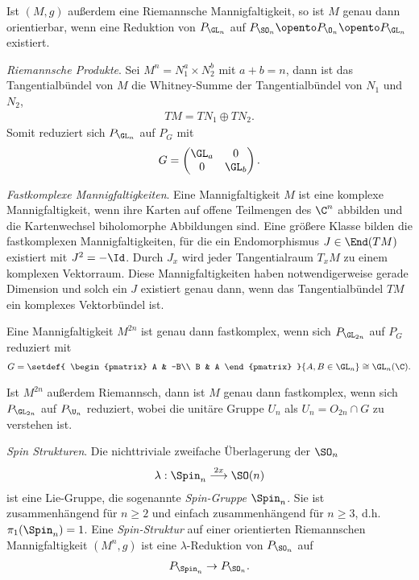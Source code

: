 \documentclass[%
	paper=a5,%
	fleqn,%
	DIV=18,%
	BCOR=0mm,
	fontsize=11pt,
	titlepage=false,%
	bibliography=totoc,
	DIV=18,%
	twoside=true,
	pdftitle=Riemannsche Geometrie,
	pdfauthor=Uwe Semmelmann,
	numbers=noendperiod]%
	{scrbook}
\begin{document}
\begin{ex}
\begin{exenum}
Ist $(M,g)$ außerdem eine Riemannsche Mannigfaltigkeit, so ist $M$ genau dann
orientierbar, wenn eine Reduktion von $P_{\GL_n}$ auf $P_{\SO_n}\opento
P_{\O_n}\opento P_{\GL_n}$ existiert.
\item \textit{Riemannsche Produkte}. Sei $M^n = N_1^a \times N_2^b$ mit $a+b =
n$, dann ist das Tangentialbündel von $M$ die Whitney-Summe der Tangentialbündel
von $N_1$ und $N_2$,
\begin{align*}
TM = TN_1\oplus TN_2.
\end{align*}
Somit reduziert sich $P_{\GL_n}$ auf $P_G$ mit
\begin{align*}
G = 
\begin{pmatrix}
\GL_a & 0 \\
0 & \GL_b
\end{pmatrix}.
\end{align*}
\item \textit{Fastkomplexe Mannigfaltigkeiten}. Eine Mannigfaltigkeit $M$ ist
eine komplexe Mannigfaltigkeit, wenn ihre Karten  auf offene
Teilmengen des $\C^n$ abbilden und die Kartenwechsel biholomorphe Abbildungen sind. 
Eine größere Klasse bilden die fastkomplexen
Mannigfaltigkeiten, für die ein Endomorphismus $J\in \End(TM)$ existiert
mit $J^2 = -\Id$. Durch $J_x$ wird jeder Tangentialraum $T_xM$ zu einem komplexen
Vektorraum.
Diese Mannigfaltigkeiten haben notwendigerweise gerade
Dimension und solch ein $J$ existiert genau dann, wenn das Tangentialbündel $TM$
ein komplexes Vektorbündel ist.

Eine Mannigfaltigkeit $M^{2n}$ ist genau dann fastkomplex, wenn sich
$P_{\GL_{2n}}$ auf $P_G$ reduziert mit
\begin{align*}
G = 
\setdef{
\begin{pmatrix}
A & -B\\
B & A
\end{pmatrix}
}{A,B\in \GL_n} \cong \GL_n(\C) .
\end{align*}

Ist $M^{2n}$ außerdem Riemannsch, dann ist $M$ genau dann fastkomplex, wenn sich
$P_{\GL_{2n}}$ auf $P_{\U_n}$ reduziert, wobei die unitäre Gruppe  $U_n$ als $U_n = O_{2n}\cap G$
zu verstehen ist.
\item \textit{Spin Strukturen}.
Die nichttriviale zweifache Überlagerung der $\SO_n$
\begin{align*}
\lambda: \Spin_n \overset{2x}{\longrightarrow} \SO(n)
\end{align*}
ist eine Lie-Gruppe, die sogenannte \emph{Spin-Gruppe} $\Spin_n$. Sie ist
zusammenhängend für $n\ge 2$ und einfach zusammenhängend für $n\ge 3$, d.h.
$\pi_1(\Spin_n) = 1$. Eine \emph{Spin-Struktur} auf einer orientierten
Riemannschen Mannigfaltigkeit $(M^n,g)$ ist eine $\lambda$-Reduktion von
$P_{\SO_n}$ auf
\begin{align*}
P_{\Spin_n}\to P_{\SO_n}.
\end{align*}


\end{exenum}
\end{ex}
\end{document}
